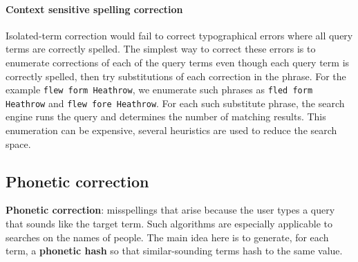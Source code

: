 \documentclass[letterpaper,11pt]{article}
\newcommand{\code}[1]{\texttt{#1}}
\begin{document}
\paragraph{Context sensitive spelling correction}
Isolated-term correction would fail to correct typographical errors where all query terms are correctly spelled. The simplest way to correct these errors is to enumerate corrections of each of the query terms even though each query term is correctly spelled, then try substitutions of each correction in the phrase. For the example \code{flew form Heathrow}, we enumerate such phrases as \code{fled form Heathrow} and \code{flew fore Heathrow}. For each such substitute phrase, the search engine runs the query and determines the number of matching results. This enumeration can be expensive, several heuristics are used to reduce the search space.
 
\subsection{Phonetic correction}
\textbf{Phonetic correction}: misspellings that arise because the user types a query that sounds like the target term. Such algorithms are especially applicable to searches on the names of people. The main idea here is to generate, for each term, a \textbf{phonetic hash} so that similar-sounding terms hash to the same value.
\end{document}
